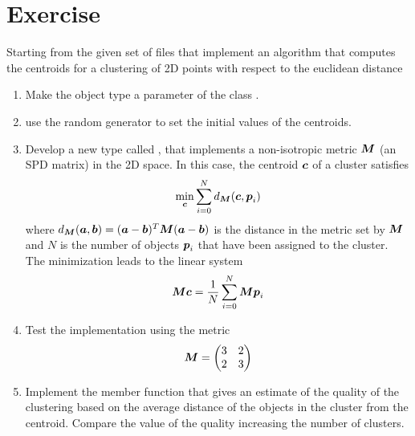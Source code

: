 \section*{Exercise}

Starting from the given set of files that implement an algorithm that computes
the centroids for a clustering of 2D points with respect to the euclidean
distance

\begin{enumerate}

\item Make the object type a parameter of the class .

\item use the random generator to set the initial values of the centroids.

\item Develop a new  type called , that
implements a non-isotropic metric $\boldsymbol{M}$ (an SPD matrix) in the 2D space. In
this case, the centroid $\boldsymbol{c}$ of a cluster satisfies
\[
\min_{\boldsymbol{c}} \sum_{i=0}^N d_{\boldsymbol{M}}( \boldsymbol{c}, \boldsymbol{p}_i )
\]
where $d_{\boldsymbol{M}}( \boldsymbol{a}, \boldsymbol{b} ) = ( \boldsymbol{a} - \boldsymbol{b} )^T \boldsymbol{M}
( \boldsymbol{a} - \boldsymbol{b} )$ is the distance in the metric set by $\boldsymbol{M}$ and $N$
is the number of objects $\boldsymbol{p}_i$ that have been assigned to the cluster.
The minimization leads to the linear system
\begin{equation}
\label{eqn:aniso_bc}
\boldsymbol{M} \boldsymbol{c} = \frac{1}{N} \sum_{i=0}^N \boldsymbol{M} \boldsymbol{p}_i
\end{equation}

\item Test the implementation using the metric
\[
\boldsymbol{M} =
\begin{pmatrix}
3 & 2 \\ 2 & 3
\end{pmatrix}
\]

\item Implement the  member function that gives an estimate
of the quality of the clustering based on the average distance of the objects
in the cluster from the centroid. Compare the value of the quality increasing
the number of clusters.

\end{enumerate}
